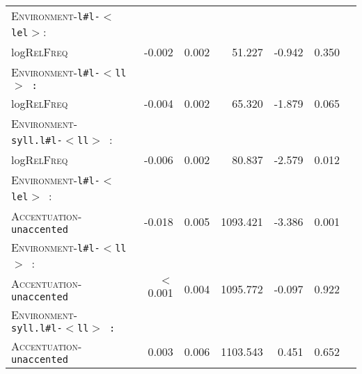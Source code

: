 \begin{table}[H]
\begin{center}
{\begin{tabular} {lrrrrrr}
		\textsc{Environment}-\texttt{l\#l-$<$lel$>$}: &&&&&\\
		log\textsc{RelFreq }& \color[HTML]{9B9B9B}-0.002 &\color[HTML]{9B9B9B} 0.002 & \color[HTML]{9B9B9B}51.227 &\color[HTML]{9B9B9B} -0.942 & \color[HTML]{9B9B9B}0.350 \\ 
		
		\textsc{Environment}-\texttt{l\#l-$<$ll$>$ :}  &&&&&\\
		log\textsc{RelFreq }&\color[HTML]{9B9B9B} -0.004 & \color[HTML]{9B9B9B}0.002 &\color[HTML]{9B9B9B} 65.320 & \color[HTML]{9B9B9B}-1.879 &\color[HTML]{9B9B9B} 0.065 \\ 
		
		\textsc{Environment}-\texttt{syll.l\#l-$<$ll$>$ }: &&&&&\\
		log\textsc{RelFreq }& -0.006 & 0.002 & 80.837 & -2.579 & 0.012 \\ 
		
		\textsc{Environment}-\texttt{l\#l-$<$lel$>$ }: &&&&&\\
		\textsc{Accentuation}-\texttt{unaccented} & -0.018 & 0.005 & 1093.421 & -3.386 & 0.001 \\ 
		
		\textsc{Environment}-\texttt{l\#l-$<$ll$>$ }: &&&&&\\
		\textsc{Accentuation}-\texttt{unaccented} & \color[HTML]{9B9B9B}$<$0.001&\color[HTML]{9B9B9B} 0.004 &\color[HTML]{9B9B9B} 1095.772 & \color[HTML]{9B9B9B}-0.097 & \color[HTML]{9B9B9B}0.922 \\ 
		
		\textsc{Environment}-\texttt{syll.l\#l-$<$ll$>$ :} &&&&&\\
		\textsc{Accentuation}-\texttt{unaccented} &\color[HTML]{9B9B9B} 0.003 & \color[HTML]{9B9B9B}0.006 &\color[HTML]{9B9B9B} 1103.543 & \color[HTML]{9B9B9B}0.451 &\color[HTML]{9B9B9B} 0.652 \\ 
		\hline
			\end{tabular}
}
\end{center}

\end{table}




